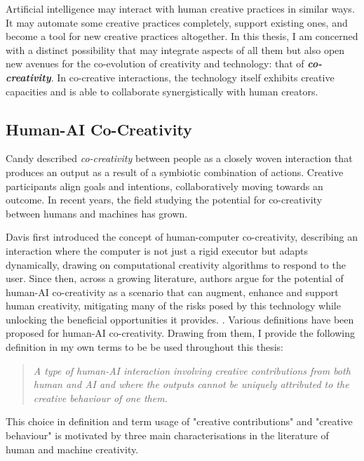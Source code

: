 Artificial intelligence may interact with human creative practices in similar ways. It may automate some creative practices completely, support existing ones, and become a tool for new creative practices altogether. In this thesis, I am concerned with a distinct possibility that may integrate aspects of all them but also open new avenues for the co-evolution of creativity and technology: that of \textit{\textbf{co-creativity}}. In co-creative interactions, the technology itself exhibits creative capacities and is able to collaborate synergistically with human creators.

\subsection{Human-AI Co-Creativity}

Candy \cite{Candy2002-ra} described \textit{co-creativity} between people as a closely woven interaction that produces an output as a result of a symbiotic combination of actions. Creative participants align goals and intentions, collaboratively moving towards an outcome. In recent years, the field studying the potential for co-creativity between humans and machines has grown. 

Davis \cite{Davis2013-jy} first introduced the concept of human-computer co-creativity, describing an interaction where the computer is not just a rigid executor but adapts dynamically, drawing on computational creativity algorithms to respond to the user. Since then, across a growing literature, authors argue for the potential of human-AI co-creativity as a scenario that can augment, enhance and support human creativity, mitigating many of the risks posed by this technology while unlocking the beneficial opportunities it provides.  \cite{Yannakakis2014-zs,Kantosalo2020-zf,Rezwana2022-gg,Moruzzi2024-cq,Haase2024-yp,Lin2023-zq,Karimi2018-wi,Vinchon2023-gh}. Various definitions have been proposed for human-AI co-creativity. Drawing from them, I provide the following definition in my own terms to be be used throughout this thesis: 

\begin{quote}
\emph{A type of human-AI interaction involving creative contributions from both human and AI and where the outputs cannot be uniquely attributed to the creative behaviour of one them.}
\end{quote}


This choice in definition and term usage of "creative contributions" and "creative behaviour" is motivated by three main characterisations in the literature of human and machine creativity. 

